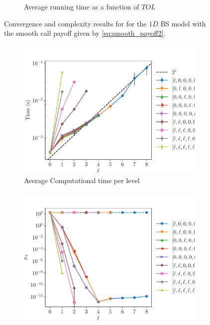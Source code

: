 \documentclass[11pt]{article}
\begin{document}
\begin{figure}[!h]
\begin{subfigure}{.5\textwidth}
		\caption{Average running time as a function of $TOL$}
		\label{fig:misc_1D_BS_8_steps_smooth_second_payoff_eps_10_5_sub2}
	\end{subfigure}%
	\caption{Convergence and complexity results for for the $1D$ BS model with the smooth call payoff given by \eqref{eq:smooth_payoff2}.}
	\label{fig:misc_1D_BS_8_steps_smooth_second_payoff_eps_10_5_1}
\end{figure}



\begin{figure}[!h]
	\centering
	\begin{subfigure}{.5\textwidth}
		\centering
		\includegraphics[width=0.95\linewidth]{./figures/1D_BS_8_steps_smooth_second_payoff_eps_10_5/level_work.pdf}
		\caption{Average Computational time per level}
		\label{fig:misc_1D_BS_8_steps_smooth_second_payoff_eps_10_5_sub3}
	\end{subfigure}%
	\begin{subfigure}{.5\textwidth}
		\centering
		\includegraphics[width=0.95\linewidth]{./figures/1D_BS_8_steps_smooth_second_payoff_eps_10_5/levels_error_rate.pdf}

\end{subfigure}
\end{figure}
\end{document}
